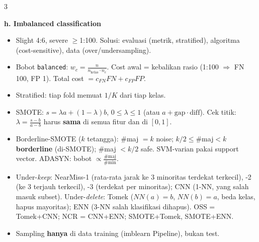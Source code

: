 \documentclass[8pt]{extarticle}
\newcommand{\sect}[1]{\par\vspace{1.5pt}\colorbox{black!12}{\parbox{\dimexpr\columnwidth-2\fboxsep}{\textbf{#1}}}\par\vspace{0.8pt}}
\begin{document}
\begin{multicols*}{3}
\sect{h. Imbalanced classification}
\begin{itemize}
\item Slight 4:6, severe $\ge$1:100. Solusi: evaluasi (metrik, stratified), algoritma (cost-sensitive), data (over/undersampling).
\item Bobot \texttt{balanced}: $w_c=\frac{n}{n_{\text{kelas}}\cdot n_c}$. Cost awal = kebalikan rasio (1:100 $\Rightarrow$ FN 100, FP 1). Total cost $=c_{FN}FN+c_{FP}FP$.
\item Stratified: tiap fold memuat $1/K$ dari tiap kelas.
\item SMOTE: $s=\lambda a+(1-\lambda)b$, $0\le\lambda\le1$ (atau $a+\text{gap}\cdot\text{diff}$). Cek titik: $\lambda=\frac{s-b}{a-b}$ harus \textbf{sama} di semua fitur dan di $[0,1]$.
\item Borderline-SMOTE ($k$ tetangga): \#maj $=k$ noise; $k/2\le$\#maj$<k$ \textbf{borderline} (di-SMOTE); \#maj $<k/2$ safe. SVM-varian pakai support vector. ADASYN: bobot $\propto\frac{\#\text{maj}}{\#\text{min}}$.
\item Under-\emph{keep}: NearMiss-1 (rata-rata jarak ke 3 minoritas terdekat terkecil), -2 (ke 3 terjauh terkecil), -3 (terdekat per minoritas); CNN (1-NN, yang salah masuk subset). Under-\emph{delete}: Tomek ($NN(a)=b$, $NN(b)=a$, beda kelas, hapus mayoritas); ENN (3-NN salah klasifikasi dihapus). OSS = Tomek+CNN; NCR = CNN+ENN; SMOTE+Tomek, SMOTE+ENN.
\item Sampling \textbf{hanya} di data training (imblearn Pipeline), bukan test.
\end{itemize}


\end{multicols*}
\end{document}
